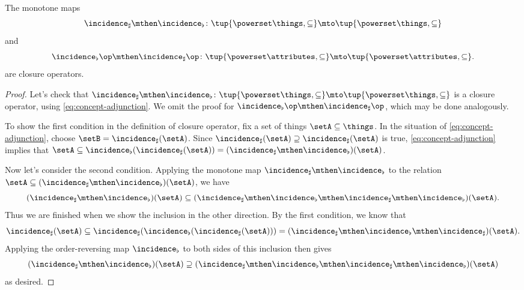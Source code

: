 \begin{lemma}\label{lem:cfa-closure-operators}
    The monotone maps
    \begin{equation}
        \incidence_\sharp \mthen \incidence_\flat \colon \tup{\powerset \things, \subseteq} \mto \tup{\powerset \things, \subseteq}
    \end{equation}
    and
    \begin{equation}
        \incidence_\flat\op \mthen \incidence_\sharp\op \colon \tup{\powerset \attributes, \subseteq} \mto \tup{\powerset \attributes, \subseteq}.
    \end{equation}
    are closure operators.
\end{lemma}

\begin{proof}
    Let's check that $\incidence_\sharp \mthen \incidence_\flat \colon \tup{\powerset \things, \subseteq} \mto \tup{\powerset \things, \subseteq}$ is a closure operator, using \cref{eq:concept-adjunction}.
    We omit the proof for $\incidence_\flat\op \mthen \incidence_\sharp\op$, which may be done analogously.

    To show the first condition in the definition of closure operator, fix a set of things $\setA \subseteq \things$.
    In the situation of \cref{eq:concept-adjunction}, choose $\setB = \incidence_\sharp(\setA)$.
    Since $\incidence_\sharp(\setA) \supseteq \incidence_\sharp(\setA)$ is true, \cref{eq:concept-adjunction} implies that $\setA \subseteq \incidence_\flat(\incidence_\sharp(\setA)) = (\incidence_\sharp \mthen \incidence_\flat)(\setA)$.

    Now let's consider the second condition.
    Applying the monotone map $\incidence_\sharp \mthen \incidence_\flat$ to the relation $\setA \subseteq (\incidence_\sharp \mthen \incidence_\flat)(\setA)$, we have
    \begin{equation}
        (\incidence_\sharp \mthen \incidence_\flat)(\setA) \subseteq (\incidence_\sharp \mthen \incidence_\flat \mthen \incidence_\sharp \mthen \incidence_\flat)(\setA).
    \end{equation}
    Thus we are finished when we show the inclusion in the other direction.
    By the first condition, we know that
    \begin{equation}
        \incidence_\sharp(\setA) \subseteq \incidence_\sharp( \incidence_\flat (\incidence_\sharp(\setA))) = (\incidence_\sharp \mthen \incidence_\flat \mthen \incidence_\sharp)(\setA).
    \end{equation}
    Applying the order-reversing map $\incidence_\flat$ to both sides of this inclusion then gives
    \begin{equation}
        (\incidence_\sharp \mthen \incidence_\flat)(\setA) \supseteq (\incidence_\sharp \mthen \incidence_\flat \mthen \incidence_\sharp \mthen \incidence_\flat)(\setA)
    \end{equation}
    as desired.
\end{proof}

